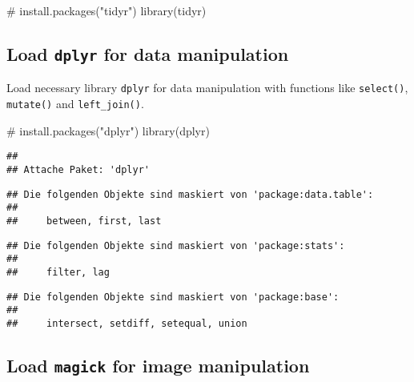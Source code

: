 \documentclass[
]{article}
\newenvironment{Shaded}{\begin{snugshade}}{\end{snugshade}}
\newcommand{\CommentTok}[1]{\textcolor[rgb]{0.54,0.53,0.53}{#1}}
\newcommand{\FunctionTok}[1]{\textcolor[rgb]{0.39,0.29,0.61}{#1}}
\newcommand{\NormalTok}[1]{\textcolor[rgb]{0.12,0.11,0.11}{#1}}
\begin{document}
\begin{Shaded}
\begin{Highlighting}[]
\CommentTok{\# install.packages("tidyr")}
\FunctionTok{library}\NormalTok{(tidyr)}
\end{Highlighting}
\end{Shaded}

\hypertarget{load-dplyr-for-data-manipulation}{%
\subsection{\texorpdfstring{Load \texttt{dplyr} for data
manipulation}{Load dplyr for data manipulation}}\label{load-dplyr-for-data-manipulation}}

Load necessary library \texttt{dplyr} for data manipulation with
functions like \texttt{select()}, \texttt{mutate()} and
\texttt{left\_join()}.

\begin{Shaded}
\begin{Highlighting}[]
\CommentTok{\# install.packages("dplyr")}
\FunctionTok{library}\NormalTok{(dplyr)}
\end{Highlighting}
\end{Shaded}

\begin{verbatim}
## 
## Attache Paket: 'dplyr'
\end{verbatim}

\begin{verbatim}
## Die folgenden Objekte sind maskiert von 'package:data.table':
## 
##     between, first, last
\end{verbatim}

\begin{verbatim}
## Die folgenden Objekte sind maskiert von 'package:stats':
## 
##     filter, lag
\end{verbatim}

\begin{verbatim}
## Die folgenden Objekte sind maskiert von 'package:base':
## 
##     intersect, setdiff, setequal, union
\end{verbatim}

\hypertarget{load-magick-for-image-manipulation}{%
\subsection{\texorpdfstring{Load \texttt{magick} for image
manipulation}{Load magick for image manipulation}}\label{load-magick-for-image-manipulation}}
\end{document}
